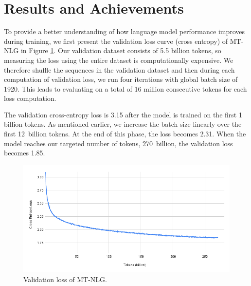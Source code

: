 \documentclass[11pt]{article}
\newcommand{\ours}{MT-NLG}
\begin{document}

\section{Results and Achievements}
\label{sec:results}

To provide a better understanding of how language model performance improves during training, we first present the validation loss curve (cross entropy) of {\ours} in Figure \ref{fig:loss_curve}. Our validation dataset consists of 5.5 billion tokens, so measuring the loss using the entire dataset is computationally expensive. We therefore shuffle the sequences in the validation dataset and then during each computation of validation loss, we run four iterations with global batch size of 1920. This leads to evaluating on a total of 16 million consecutive tokens for each loss computation.

The validation cross-entropy loss is %
3.15 after the model is trained on the first 1 billion tokens. As mentioned earlier, we increase the batch size linearly over the first 12~billion tokens. At the end of this phase, the loss becomes 2.31. When the model reaches our targeted number of tokens, 270~billion, the validation loss becomes 1.85. 

\begin{figure}
    \centering
    \includegraphics[width=0.8\linewidth]{loss_curve_val.png}
    \caption{Validation loss of {\ours}.}
    \label{fig:loss_curve}
\end{figure}
\end{document}
